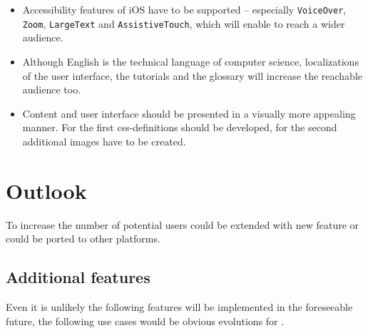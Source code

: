 \begin{itemize}

\item Accessibility features of iOS have to be supported – especially 
\verb+VoiceOver+, \verb+Zoom+, \verb+LargeText+ and \verb+AssistiveTouch+,
which will enable \Nyaya to reach a wider audience.

\item Although English is the technical language of computer science,
localizations of the user interface, the tutorials and the glossary will increase 
the reachable audience too.
%
%


\item Content and user interface should be presented in a visually more appealing manner.
For the first css-definitions should be developed, for the second additional images have to be created.

\end{itemize}
%
%
%
%
%

\section{Outlook}

To increase the number of potential users
\Nyaya could be extended with new feature
or \Nyaya could be ported to other platforms.

\subsection{Additional features}

Even it is unlikely the following features will be implemented in the foreseeable future, 
the following use cases would be obvious evolutions for \Nyaya.

